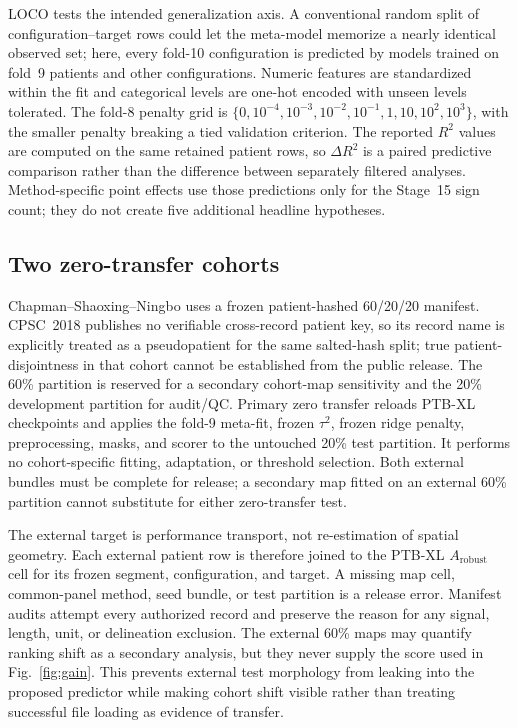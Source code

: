 \documentclass{article}
\begin{document}
LOCO tests the intended generalization axis.  A conventional random split of configuration--target
rows could let the meta-model memorize a nearly identical observed set; here, every fold-10
configuration is predicted by models trained on fold~9 patients and other configurations.  Numeric
features are standardized within the fit and categorical levels are one-hot encoded with unseen
levels tolerated.  The fold-8 penalty grid is
$\{0,10^{-4},10^{-3},10^{-2},10^{-1},1,10,10^2,10^3\}$, with the smaller penalty breaking a tied
validation criterion.  The reported $R^2$ values are computed on the same retained patient rows, so
$\Delta R^2$ is a paired predictive comparison rather than the difference between separately
filtered analyses.  Method-specific point effects use those predictions only for the Stage~15 sign
count; they do not create five additional headline hypotheses.

\subsection{Two zero-transfer cohorts}
Chapman--Shaoxing--Ningbo \cite{zheng2020chapman} uses a frozen patient-hashed 60/20/20 manifest.
CPSC~2018 \cite{liu2018cpsc} publishes no verifiable cross-record patient key, so its record name is
explicitly treated as a pseudopatient for the same salted-hash split; true patient-disjointness in
that cohort cannot be established from the public release.  The 60\% partition is reserved for a
secondary cohort-map sensitivity and the 20\% development partition for audit/QC.  Primary zero transfer reloads PTB-XL
checkpoints and applies the fold-9 meta-fit, frozen $\tau^2$, frozen ridge penalty, preprocessing,
masks, and scorer to the untouched 20\% test partition.  It performs no cohort-specific fitting,
adaptation, or threshold selection.  Both external bundles must be complete for release; a
secondary map fitted on an external 60\% partition cannot substitute for either zero-transfer test.

The external target is performance transport, not re-estimation of spatial geometry.  Each
external patient row is therefore joined to the PTB-XL $A_{\mathrm{robust}}$ cell for its frozen
segment, configuration, and target.  A missing map cell, common-panel method, seed bundle, or test
partition is a release error.  Manifest audits attempt every authorized record and preserve the
reason for any signal, length, unit, or delineation exclusion.  The external 60\% maps may quantify
ranking shift as a secondary analysis, but they never supply the score used in Fig.~\ref{fig:gain}.
This prevents external test morphology from leaking into the proposed predictor while making
cohort shift visible rather than treating successful file loading as evidence of transfer.
\end{document}
